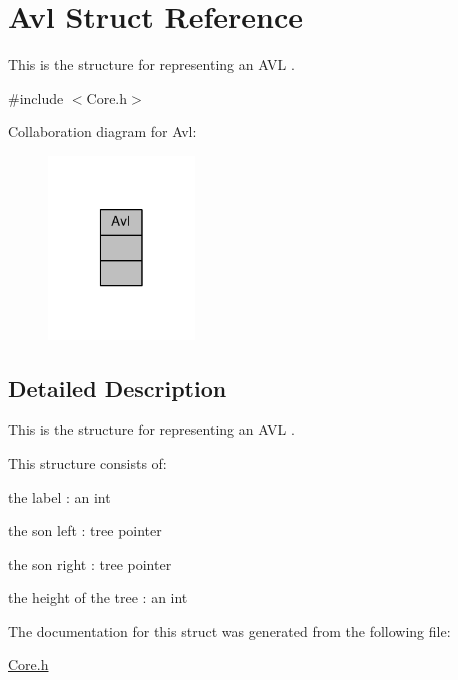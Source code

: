 \hypertarget{structAvl}{\section{Avl Struct Reference}
\label{structAvl}
}


This is the structure for representing an A\-V\-L .  




{\ttfamily \#include $<$Core.\-h$>$}



Collaboration diagram for Avl\-:
\nopagebreak
\begin{figure}[H]
\begin{center}
\leavevmode
\includegraphics[width=110pt]{structAvl__coll__graph}
\end{center}
\end{figure}


\subsection{Detailed Description}
This is the structure for representing an A\-V\-L . 

This structure consists of\-:
\begin{DoxyItemize}
\item the label \-: an int
\item the son left \-: tree pointer
\item the son right \-: tree pointer
\item the height of the tree \-: an int 
\end{DoxyItemize}

The documentation for this struct was generated from the following file\-:\begin{DoxyCompactItemize}
\item 
\hyperlink{Core_8h}{Core.\-h}\end{DoxyCompactItemize}
